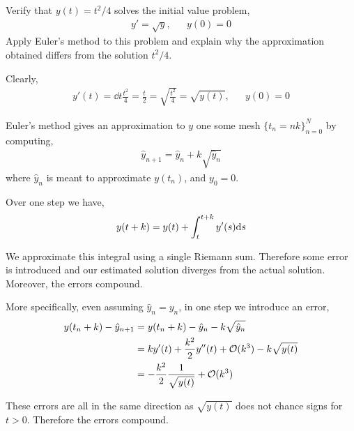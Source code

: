 \documentclass[10pt]{article}
\begin{document}
\begin{problem}
Verify that \( y(t) = t^2/4 \) solves the initial value problem,
\begin{align*}
    y' = \sqrt{y}, && y(0) = 0
\end{align*}
Apply Euler’s method to this problem and explain why the approximation obtained differs
from the solution \( t^2/4 \).
\end{problem}

\begin{solution}[Solution]
Clearly,
\begin{align*}
    y'(t) = \dd{}{t} \frac{t^2}{4} = \frac{t}{2} = \sqrt{\frac{t^2}{4}} = \sqrt{y(t)}, && y(0) = 0
\end{align*}

Euler's method gives an approximation to \( y \) one some mesh \( \{ t_n = n k \}_{n=0}^{N}  \) by computing,
\begin{align*}
    \hat{y}_{n+1} = \hat{y}_n + k \sqrt{\hat{y}_n}
\end{align*}
where \( \hat{y}_n  \) is meant to approximate \( y(t_n) \), and \( y_0 = 0 \).

Over one step we have,
\begin{align*}
    y(t+k) = y(t) + \int_t^{t+k} y'(s)\mathrm{d} s
\end{align*}

We approximate this integral using a single Riemann sum. Therefore some error is introduced and our estimated solution diverges from the actual solution. Moreover, the errors compound.

    More specifically, even assuming \( \hat{y}_n = y_n \), in one step we introduce an error,
\begin{align*}
    y(t_n+k) - \hat{y}_{n+1} &=  y(t_n+k) - \hat{y}_n - k\sqrt{\hat{y}_n} 
    \\&= k y'(t) + \frac{k^2}{2}y''(t) + \mathcal{O}(k^3) - k\sqrt{y(t)} 
    \\&= -\frac{k^2}{2} \frac{1}{\sqrt{y(t)}} + \mathcal{O}(k^3)
\end{align*}

    These errors are all in the same direction as \( \sqrt{y(t)} \) does not chance signs for \( t>0 \). Therefore the errors compound.

\end{solution}
\end{document}
